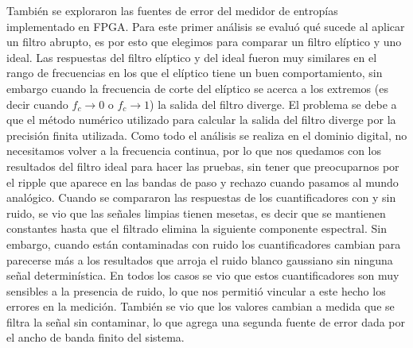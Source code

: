 También se exploraron las fuentes de error del medidor de entropías implementado en FPGA.
Para este primer análisis se evaluó qué sucede al aplicar un filtro abrupto, es por esto que elegimos para comparar un filtro elíptico y uno ideal. 
Las respuestas del filtro elíptico y del ideal fueron muy similares en el rango de frecuencias en los que el elíptico tiene un buen comportamiento, sin embargo cuando la frecuencia de corte del elíptico se acerca a los extremos (es decir cuando $f_c \to 0$ o $f_c \to 1$) la salida del filtro diverge.
El problema se debe a que el método numérico utilizado para calcular la salida del filtro diverge por la precisión finita utilizada.
Como todo el análisis se realiza en el dominio digital, no necesitamos volver a la frecuencia continua, por lo que nos quedamos con los resultados del filtro ideal para hacer las pruebas, sin tener que preocuparnos por el ripple que aparece en las bandas de paso y rechazo cuando pasamos al mundo analógico.
Cuando se compararon las respuestas de los cuantificadores con y sin ruido, se vio que las señales limpias tienen mesetas, es decir que se mantienen constantes hasta que el filtrado elimina la siguiente componente espectral.
Sin embargo, cuando están contaminadas con ruido los cuantificadores cambian para parecerse más a los resultados que arroja el ruido blanco gaussiano sin ninguna señal determinística.
En todos los casos se vio que estos cuantificadores son muy sensibles a la presencia de ruido, lo que nos permitió vincular a este hecho los errores en la medición.
También se vio que los valores cambian a medida que se filtra la señal sin contaminar, lo que agrega una segunda fuente de error dada por el ancho de banda finito del sistema.